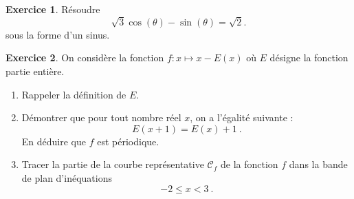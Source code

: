 \documentclass[a4paper, 11pt,openany]{article}%
\theoremstyle{plain}
\theoremstyle{definition}
\newtheorem{exo}{Exercice}
\newtheorem{sol}{Solution de l'exercice}
\theoremstyle{remark}
\newcommand{\Z}{\mathbb{Z}}
\begin{document}
\begin{exo}
Résoudre 
\[ \sqrt{3} \cos(\theta) -  \sin (\theta) = \sqrt{2}.\]
sous la forme d'un sinus.
\end{exo}
%

\begin{exo}
	On considère la fonction $f\colon x \mapsto x - E(x)$ où $E$ désigne la fonction partie entière.
	\begin{enumerate}
		\item Rappeler la définition de $E$.
		\item Démontrer que pour tout nombre réel $x$, on a l'égalité suivante :
		\[
			E(x+1)	= E(x) + 1 \ .
		\]
		En déduire que $f$ est périodique. 
		\item Tracer la partie de la courbe représentative $\mathcal{C}_f$ de la fonction $f$ dans la bande de plan d'inéquations
		\[
			-2 \leqslant x < 3 \ .
		\]
	\end{enumerate}
\end{exo}
\end{document}
